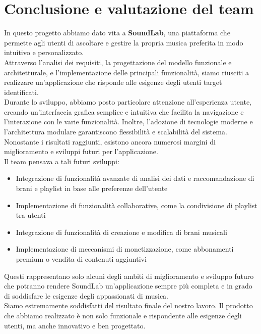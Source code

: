 \documentclass{article}
\begin{document}
		
	\section{Conclusione e valutazione del team}
	In questo progetto abbiamo dato vita a  \textbf{SoundLab}, una piattaforma che permette agli utenti di ascoltare e gestire la propria musica preferita in modo intuitivo e personalizzato.\\
	Attraverso l'analisi dei requisiti, la progettazione del modello funzionale e architetturale, e l'implementazione delle principali funzionalità, siamo riusciti a realizzare un'applicazione che risponde alle esigenze degli utenti target identificati.\\
	Durante lo sviluppo, abbiamo posto particolare attenzione all'esperienza utente, creando un'interfaccia grafica semplice e intuitiva che facilita la navigazione e l'interazione con le varie funzionalità. Inoltre, l'adozione di tecnologie moderne e l'architettura modulare garantiscono flessibilità e scalabilità del sistema.\\
	Nonostante i risultati raggiunti, esistono ancora numerosi margini di miglioramento e sviluppi futuri per l'applicazione.\\
	Il team pensava a tali futuri sviluppi:
	\begin{itemize}
		\item Integrazione di funzionalità avanzate di analisi dei dati e raccomandazione di brani e playlist in base alle preferenze dell'utente
		\item Implementazione di funzionalità collaborative, come la condivisione di playlist tra utenti
		\item Integrazione di funzionalità di creazione e modifica di brani musicali
		\item Implementazione di meccanismi di monetizzazione, come abbonamenti premium o vendita di contenuti aggiuntivi
	\end{itemize}
	Questi rappresentano solo alcuni degli ambiti di miglioramento e sviluppo futuro che potranno rendere SoundLab un'applicazione sempre più completa e in grado di soddisfare le esigenze degli appassionati di musica.
	\\
	Siamo estremamente soddisfatti del risultato finale del nostro lavoro. Il prodotto che abbiamo realizzato è non solo funzionale e rispondente alle esigenze degli utenti, ma anche innovativo e ben progettato.\\
\end{document}
